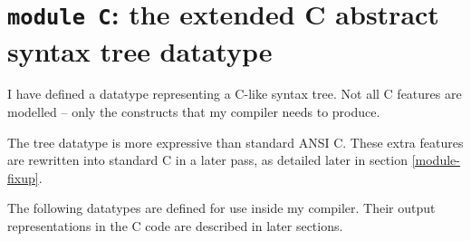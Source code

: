 \documentclass[12pt,a4paper,twoside,openright]{report}
\begin{document}
\section{\texttt{module C}: the extended C abstract syntax tree datatype}\label{module-c}

I have defined a datatype representing a C-like syntax tree. Not all C features
are modelled -- only the constructs that my compiler needs to produce.

The tree datatype is more expressive than standard ANSI C. These extra
features are rewritten into standard C in a later pass, as detailed later in
section \ref{module-fixup}.

The following datatypes are defined for use inside my compiler. Their output representations in the C code are described in later sections.
\end{document}
